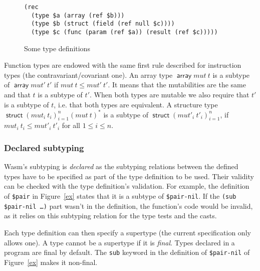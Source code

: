 \documentclass[a4paper,11pt]{article}
\DeclareMathOperator{\strt}{\textsf{struct}}
\DeclareMathOperator{\arrt}{\textsf{array}}
\begin{document}
\begin{figure}[h]
  \begin{lstlisting}
(rec
  (type $a (array (ref $b)))
  (type $b (struct (field (ref null $c))))
  (type $c (func (param (ref $a)) (result (ref $c)))))
  \end{lstlisting}
  \caption{Some type definitions}\label{tdef}
\end{figure}

Function types are endowed with the same first rule described for instruction
types (the contravariant/covariant one). An array type $\arrt mut\ t$ is a
subtype of $\arrt mut'\ t'$ if $mut\ t\leq mut'\ t'$. It means that the
mutabilities are the same and that $t$ is a subtype of $t'$. When both types are
mutable we also require that $t'$ is a subtype of $t$, i.e. that both types are
equivalent. A structure type $\strt {(mut_i\ t_i)}_{i=1}^n {(mut\ t)}^*$ is a
subtype of $\strt {(mut'_i\ t'_i)}_{i=1}^n$, if $mut_i\ t_i\leq mut'_i\ t'_i$ for
all $1\leq i\leq n$.

\subsubsection{Declared subtyping}
Wasm's subtyping is \emph{declared} as the subtyping relations between the
defined types have to be specified as part of the type definition to be used.
Their validity can be checked with the type definition's validation. For
example, the definition of \texttt{\$pair} in Figure~\ref{ex} states that it is
a subtype of \texttt{\$pair-nil}. If the \texttt{(sub \$pair-nil \dots)} part
wasn't in the definition, the function's code would be invalid, as it relies on
this subtyping relation for the type tests and the casts.

Each type definition can then specify a supertype (the current specification
only allows one). A type cannot be a supertype if it is \emph{final}. Types
declared in a program are final by default. The \texttt{sub} keyword in the
definition of \texttt{\$pair-nil} of Figure~\ref{ex} makes it non-final.
\end{document}
